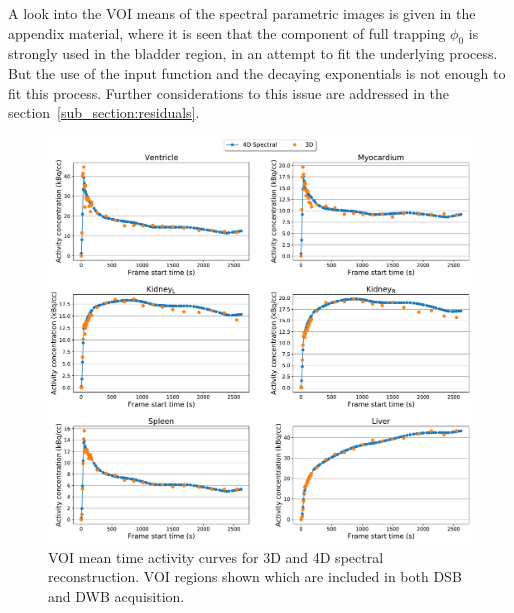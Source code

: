 A look into the VOI means of the spectral parametric images is given in the appendix material, where it is seen that the component of full trapping $\phi_0$ is strongly used in the bladder region, in an attempt to fit the underlying process. But the use of the input function and the decaying exponentials is not enough to fit this process. Further considerations to this issue are addressed in the section~\ref{sub_section:residuals}.

\begin{figure} [h!]
\centering
\includegraphics[scale=0.5,angle=0]{3_Results/3_3_DWB_Reconstruction/figures/3_3_IsotoPK_CTRL_DWB_3D_vs_4D_central.pdf}
\caption{VOI mean time activity curves for 3D and 4D spectral reconstruction. VOI regions shown which are included in both DSB and DWB acquisition.}
\label{fig_3_3:IsotoPK_CTRL_DWB_4D_vs_3D_Central}
\end{figure}

